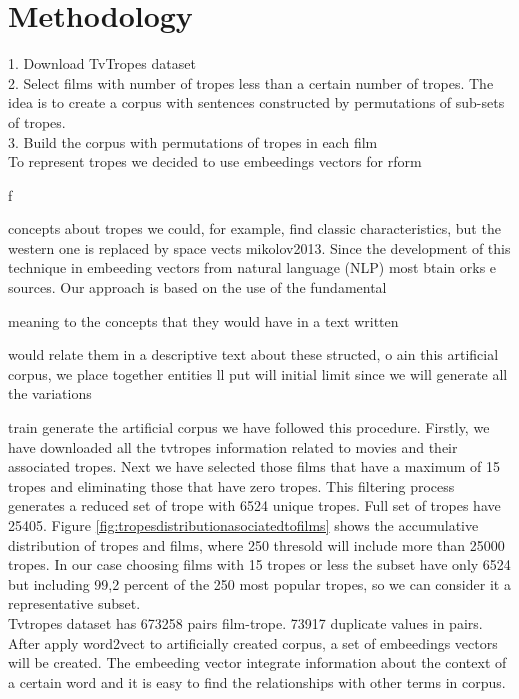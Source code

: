\documentclass[letterpaper]{article}
\begin{document}
\section{Methodology}
\label{sec:met}
	
	1. Download TvTropes dataset \\
	2. Select films with number of tropes less than a certain number of tropes. The idea is to create a corpus with sentences constructed by permutations of sub-sets of tropes. \\
	3. Build the corpus with permutations of tropes in each film \\


	To represent tropes we decided to use embeedings vectors for
rform

f

        concepts about tropes we could, for example, find classic
characteristics, but the western one is replaced by space
vects
{mikolov2013}. Since the development of this technique in
        embeeding vectors from natural language (NLP) most
btain
orks
e
 sources. Our approach is based on the use of the fundamental

       meaning to the concepts that they would have in a text written

       would relate them in a descriptive text about these
structed,
o
ain this artificial corpus, we place together entities
ll
put
will
       initial limit since we will generate all the variations

train
generate the artificial corpus we have followed this procedure. Firstly, we have downloaded all the tvtropes information related to movies and their associated tropes. Next we have selected those films that have a maximum of 15 tropes and eliminating those that have zero tropes. This filtering process generates a reduced set of trope with 6524 unique tropes. Full set of tropes have 25405. Figure  \ref{fig:tropesdistributionasociatedtofilms} shows the accumulative distribution of tropes and films, where 250 thresold will include more than 25000 tropes. In our case choosing films with 15 tropes or less the subset have only 6524 but including 99,2 percent of the 250 most popular tropes, so we can consider it a representative subset.\\
 Tvtropes dataset has 673258 pairs film-trope. 73917 duplicate values in pairs. After apply word2vect to artificially created corpus, a set of embeedings vectors will be created. The embeeding vector integrate information about the context of a certain word and it is easy to find the relationships with other terms in corpus.\\
\end{document}

